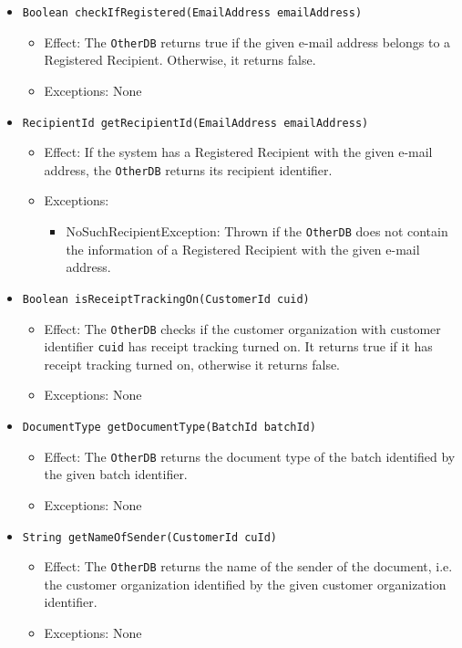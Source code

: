 \documentclass[a4paper,10pt]{article}
\begin{document}
\begin{itemize}
\begin{itemize}
           \item \texttt{Boolean checkIfRegistered(EmailAddress emailAddress) }        
		\begin{itemize}
			\item Effect: The \texttt{OtherDB} returns true if the given e-mail address belongs to a Registered Recipient. Otherwise, it returns false.
			\item Exceptions: None
		\end{itemize}
		
		   \item \texttt{RecipientId getRecipientId(EmailAddress emailAddress) }        
		\begin{itemize}
			\item Effect: If the system has a Registered Recipient with the given e-mail address, the \texttt{OtherDB} returns its recipient identifier.
			\item Exceptions: 
			\begin{itemize}
				\item NoSuchRecipientException: Thrown if the \texttt{OtherDB} does not contain the information of a Registered Recipient with the given e-mail address.
			\end{itemize}
		\end{itemize}  		

		\item \texttt{Boolean isReceiptTrackingOn(CustomerId cuid)}        
		\begin{itemize}
			\item Effect: The \texttt{OtherDB} checks if the customer organization with customer identifier \texttt{cuid} has receipt tracking turned on. It returns true if it has receipt tracking turned on, otherwise it returns false.
			\item Exceptions: None
		\end{itemize}
		
		\item \texttt{DocumentType getDocumentType(BatchId batchId)}        
		\begin{itemize}
			\item Effect: The \texttt{OtherDB} returns the document type of the batch identified by the given batch identifier.
			\item Exceptions: None
		\end{itemize}

		
		\item \texttt{String getNameOfSender(CustomerId cuId)}    
        \begin{itemize}
            \item Effect: The \texttt{OtherDB} returns the name of the sender of the document, i.e. the customer organization identified by the given customer organization identifier.
            \item Exceptions: None	
		\end{itemize}


\end{itemize}
\end{itemize}
\end{document}

